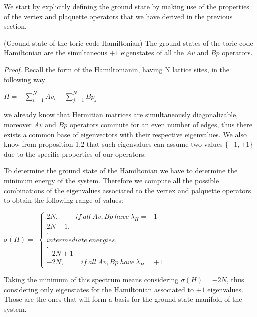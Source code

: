 \documentclass{Configuration_Files/PoliMi3i_thesis}
\begin{document}
We start by explicitly defining the ground state by making use of the properties of the vertex and plaquette operators that we have derived in the previous section.

\begin{proposition} (Ground state of the toric code Hamiltonian) The ground states of the toric code Hamiltonian are the simultaneous $+1$ eigenstates of all the $Av$ and $Bp$ operators. 
\end{proposition}

\textit{Proof.}\newline 
Recall the form of the Hamiltonianin, having N lattice sites, in the following way 

\begin{center}
	
	$H = -\sum_{i=1}^{N}
	Av_i - \sum_{j=1}^{N} Bp_j $
	
\end{center}

we already know that Hermitian matrices are simultaneously diagonalizable, moreover $Av$ and $Bp$ operators commute for an even number of edges, thus there exists a common base of eigenvectors with their respective eigenvalues. We also know from proposition 1.2 that such eigenvalues can assume two values $\{-1,+1\}$ due to the specific properties of our operators.

To determine the ground state of the Hamiltonian we have to determine the minimum energy of the system. Therefore we compute all the possible combinations of the eigenvalues associated to the vertex and palquette operators to obtain the following range of values:

\begin{center}
	$\sigma( H) =$
	$\begin{cases}
		2N, \hspace{1cm} if \ all\ Av,Bp \ have \ \lambda_{H}= -1\\
		2N-1,\\
		.\\
		intermediate \ energies,\\
		.\\
		-2N+1\\
		-2N, \hspace{1cm} if \ all \ Av,Bp \ have \ \lambda_{H}= +1
	\end{cases}$
	
\end{center}

Taking the minimum of this spectrum means considering $\sigma(H)=-2N$, thus considering only eigenstates for the Hamiltonian associated to $+1$ eigenvalues.
Those are the ones that will form a basis for the ground state manifold of the system.\newline
\end{document}
